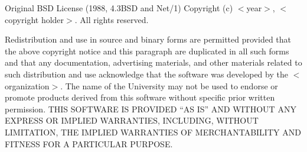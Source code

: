 \documentclass{beamer}
\begin{document}
\begin{frame}

\begin{block}{Original BSD License (1988, 4.3BSD and Net/1)}
Copyright (c) $<$year$>$, $<$copyright holder$>$. All rights reserved. 

\medskip

Redistribution and use in source and binary forms are permitted
provided that the above copyright notice and this paragraph are
duplicated in all such forms and that any documentation,
advertising materials, and other materials related to such
distribution and use acknowledge that the software was developed
by the $<$organization$>$.  The name of the
University may not be used to endorse or promote products derived
from this software without specific prior written permission.
THIS SOFTWARE IS PROVIDED ``AS IS'' AND WITHOUT ANY EXPRESS OR
IMPLIED WARRANTIES, INCLUDING, WITHOUT LIMITATION, THE IMPLIED
WARRANTIES OF MERCHANTABILITY AND FITNESS FOR A PARTICULAR PURPOSE.
 
\end{block}

\end{frame}

\end{document}
